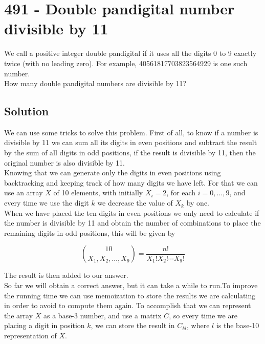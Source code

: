 \chapter*{491 - Double pandigital number divisible by 11}

  
We call a positive integer double pandigital if it uses all the digits 0 to 9 exactly twice (with no leading zero). For example, 40561817703823564929 is one such number.\\

How many double pandigital numbers are divisible by 11?

\section*{Solution}

We can use some tricks to solve this problem. First of all, to know if a number is divisible by 11 we can sum all its digits in even positions and subtract the result by the sum of all digits in odd positions, if the result is divisible by 11, then the original number is also divisible by 11.\\

Knowing that we can generate only the digits in even positions using backtracking and keeping track of how many digits we have left. For that we can use an array $X$ of 10 elements, with initially $X_i = 2$, for each $i=0, \ldots, 9$, and every time we use the digit $k$ we decrease the value of $X_k$ by one.\\

When we have placed the ten digits in even positions we only need to calculate if the number is divisible by 11 and obtain the number of combinations to place the remaining digits in odd positions, this will be given by

$$
    \binom {10}{X_1,X_2,\ldots,X_9} = \frac{n!}{X_1!X_2!\cdots X_9!}
$$

The result is then added to our answer. \\

So far we will obtain a correct answer, but it can take a while to run.To improve the running time we can use memoization to store the results we are calculating in order to avoid to compute them again. To accomplish that we can represent the array $X$ as a base-3 number, and use a matrix $C$, so every time we are placing a digit in position $k$, we can store the result in $C_{kl}$, where $l$ is the base-10 representation of $X$.